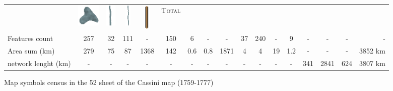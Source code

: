 \documentclass[portrait,a0]{sciposter}
\begin{document}
\begin{minipage}[b]{\textwidth}
\begin{multicols}{3}
\begin{tabular}{l|cccccccc|c|ccccc|c|r}
&\includegraphics[height=30pt]{gfx/lac_couleur.png}
&\includegraphics[height=30pt]{gfx/riviere_medium_couleur.png}
&\includegraphics[height=30pt]{gfx/riviere_small_couleur.png}
&\includegraphics[height=35pt]{gfx/routes_couleur.png}
&\textsc{Total}\\
Features count&257&32&111&-&150&6&-&-&37&240&-&9&-&-&-&-\\
Area sum (km\up{2})&\num{279}&\num{75}&\num{87}&\num{1368}&\num{142}&\num{0,6}&\num{0,8}&\num{1871}&\num{4}&\num{4}&\num{19}&\num{1,2}&-&-&-&\num{3852} km\up{2}\\
network lenght (km)&-&-&-&-&-&-&-&-&-&-&-&-&\num{341}&\num{2841}&\num{624}&\num{3807} km
\end{tabular}


\footnotesize
\captionsetup{type=table}
\caption{Map symbols census in the 52 sheet of the Cassini map (1759-1777)}\label{tab:symbols}


\end{multicols}
\end{minipage}
\end{document}
